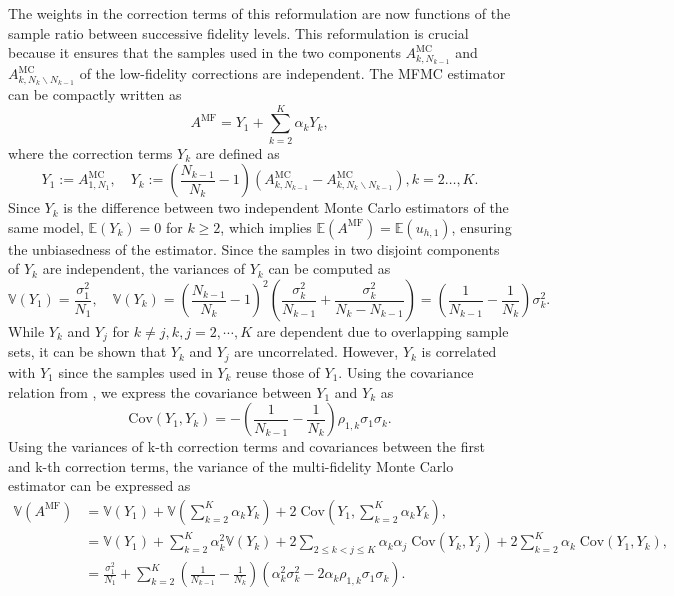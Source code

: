 %
The weights in the correction terms of this reformulation  are now functions of the sample ratio between successive fidelity levels. This reformulation is crucial because it ensures that the samples used in  the two components $A_{k,N_{k-1}}^{\text{MC}}$ and $A_{k,N_k\backslash N_{k-1}}^{\text{MC}}$ of the low-fidelity corrections are independent. The MFMC estimator can be compactly written as
%
\[
A^{\text{MF}} = Y_1 + \sum_{k=2}^K \alpha_k Y_k,
\]
%
where the correction terms $Y_k$ are defined as
%
\[
Y_1 :=A^{\text{MC}}_{1,N_1},\quad Y_k:=\left(\frac{N_{k-1}}{N_{k}}-1\right)\left(A_{k,N_{k-1}}^{\text{MC}}- A_{k,N_k\backslash N_{k-1}}^{\text{MC}}\right), k=2\ldots, K.
\]
%
Since $Y_k$ is the difference between two independent Monte Carlo estimators of the same model, $\mathbb{E}(Y_k) = 0$ for $k\ge 2$, which implies $\mathbb{E}(A^{\text{MF}}) = \mathbb{E}(u_{h,1})$, ensuring the unbiasedness of the estimator. Since the samples in two disjoint components of $Y_k$ are independent, the variances of $Y_k$ can be computed as
%
\[
\mathbb{V}\left(Y_1\right) = \frac{\sigma_1^2}{N_1}, \quad \mathbb{V}\left(Y_k\right) = \left(\frac{N_{k-1}}{N_{k}}-1\right)^2\left(\frac{\sigma_k^2}{N_{k-1}}+\frac{\sigma_k^2}{N_k-N_{k-1}}\right) = \left(\frac{1}{N_{k-1}} - \frac{1}{N_k}\right)\sigma_k^2.
\]
%
While $Y_k$ and $Y_j$ for $k\neq j, k,j=2,\cdots, K$ are dependent due to overlapping sample sets, it can be shown that $Y_k$ and $Y_j$ are uncorrelated. However, $Y_k$  is correlated with $Y_1$ since the samples used in $Y_k$ reuse those of $Y_1$. Using the covariance relation from \cite[Lemma~3.2]{PeWiGu:2016}, we express the covariance between $Y_1$ and $Y_k$ as
%
\[
\text{Cov}(Y_1,Y_k) = - \left(\frac{1}{N_{k-1}} - \frac{1}{N_k}\right)\rho_{1,k}\sigma_1\sigma_k.
\]
%
Using the variances of k-th correction terms and covariances between the first and k-th correction terms, the variance of the multi-fidelity Monte Carlo estimator can be expressed as
%
\begin{align}
    \nonumber
    \mathbb{V}\left(A^{\text{MF}}\right) &= \mathbb{V}\left(Y_1\right) + \mathbb{V}\left(\sum_{k=2}^K \alpha_kY_k\right)+2\;\text{Cov}\left(Y_1,\sum_{k=2}^K \alpha_k Y_k \right),\\
    \nonumber
    &=\mathbb{V}\left(Y_1\right) + \sum_{k=2}^K \alpha_k^2 \mathbb{V}\left(Y_k\right)+2\sum_{2\le k<j\le K} \alpha_k\alpha_j\; \text{Cov}(Y_k,Y_j) +2\sum_{k=2}^K \alpha_k\;\text{Cov}\left(Y_1, Y_k\right),\\
    \label{eq:MFMC_variance}
    &=\frac{\sigma_1^2}{N_1} + \sum_{k=2}^K \left(\frac{1}{N_{k-1}} - \frac{1}{N_k}\right)\left(\alpha_k^2\sigma_k^2 - 2\alpha_k\rho_{1,k}\sigma_1\sigma_k\right).
\end{align}
